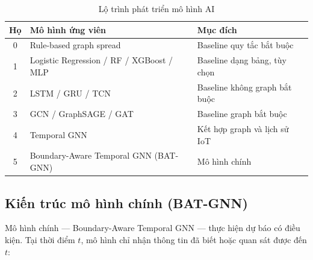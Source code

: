 \begin{table}[H]
\centering
\caption{Lộ trình phát triển mô hình AI}
\label{tab:modelroadmap}
\begin{tabularx}{\textwidth}{c l X}
\toprule
\textbf{Họ} & \textbf{Mô hình ứng viên} & \textbf{Mục đích} \\
\midrule
0 & Rule-based graph spread          & Baseline quy tắc bắt buộc \\
1 & Logistic Regression / RF / XGBoost / MLP & Baseline dạng bảng, tùy chọn \\
2 & LSTM / GRU / TCN                 & Baseline không graph bắt buộc \\
3 & GCN / GraphSAGE / GAT           & Baseline graph bắt buộc \\
4 & Temporal GNN                     & Kết hợp graph và lịch sử IoT \\
5 & Boundary-Aware Temporal GNN (BAT-GNN) & Mô hình chính \\
\bottomrule
\end{tabularx}
\end{table}

\subsection{Kiến trúc mô hình chính (BAT-GNN)}

Mô hình chính --- Boundary-Aware Temporal GNN --- thực hiện dự báo có điều kiện. Tại thời điểm $t$, mô hình chỉ nhận thông tin đã biết hoặc quan sát được đến $t$:

